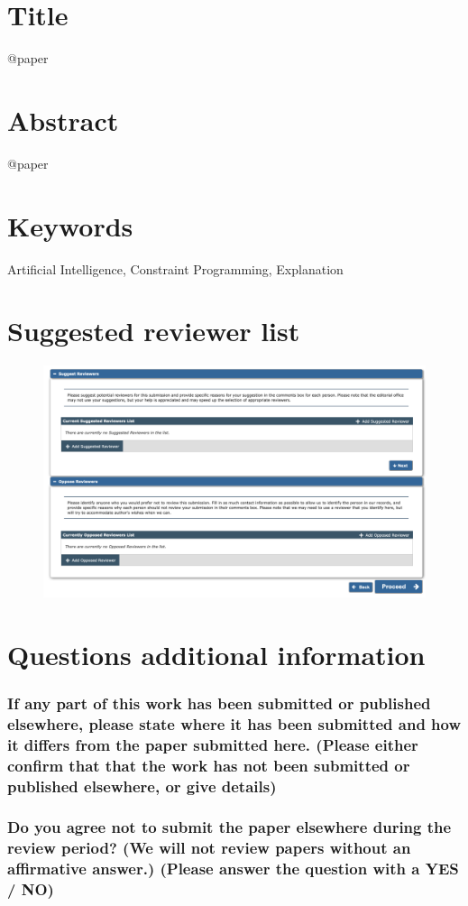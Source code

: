 \documentclass{article}
\begin{document}
\section*{Title}
@paper
\section*{Abstract}
@paper
\section*{Keywords}
Artificial Intelligence, Constraint Programming, Explanation

\section*{Suggested reviewer list}
\begin{figure}[h!]
    \centering
    \includegraphics[width=\textwidth]{reviewers}
\end{figure}

\section*{Questions additional information}
\subsubsection*{If any part of this work has been submitted or published elsewhere, please state where it has been submitted and how it differs from the paper submitted here. (Please either confirm that that the work has not been submitted or published elsewhere, or give details)}



\subsubsection*{Do you agree not to submit the paper elsewhere during the review period? (We will not review papers without an affirmative answer.) (Please answer the question with a YES / NO)}
\end{document}
